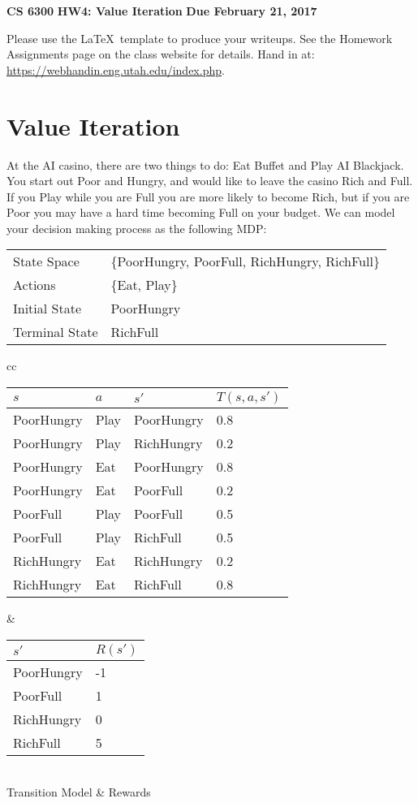\documentclass[12pt]{article}
\begin{document}
\begin{center}
{\bf CS 6300} \hfill {\large\bf HW4: Value Iteration} \hfill {\bf Due February 21, 2017}
\end{center}

\noindent
Please use the \LaTeX\ template to produce your writeups. See the
Homework Assignments page on the class website for details.  Hand in
at: \url{https://webhandin.eng.utah.edu/index.php}.

\section{Value Iteration}

At the AI casino, there are two things to do: Eat Buffet and Play AI
Blackjack.  You start out Poor and Hungry, and would like to leave the
casino Rich and Full.  If you Play while you are Full you are more
likely to become Rich, but if you are Poor you may have a hard time
becoming Full on your budget.  We can model your decision making
process as the following MDP:

\begin{flushleft}
\begin{tabular}{ll}
State Space & \{PoorHungry, PoorFull, RichHungry, RichFull\} \\
Actions     & \{Eat, Play\} \\
Initial State &  PoorHungry \\
Terminal State & RichFull 
\end{tabular}
\end{flushleft}

\begin{center}
\begin{tabular}{cc}
\begin{tabular}{|l|l|l|l|} \hline
$s$        & $a$  & $s'$       & $T(s,a,s')$ \\ \hline
PoorHungry & Play & PoorHungry & 0.8 \\ \hline
PoorHungry & Play & RichHungry & 0.2 \\ \hline
PoorHungry & Eat  & PoorHungry & 0.8 \\ \hline
PoorHungry & Eat  & PoorFull   & 0.2 \\ \hline
PoorFull   & Play & PoorFull   & 0.5 \\ \hline
PoorFull   & Play & RichFull   & 0.5 \\ \hline
RichHungry & Eat  & RichHungry & 0.2 \\ \hline
RichHungry & Eat  &RichFull    & 0.8 \\ \hline
\end{tabular} &
\begin{tabular}{|l|l|}\hline
$s'$       & $R(s')$ \\ \hline
PoorHungry & -1 \\  \hline
PoorFull   &  1 \\ \hline
RichHungry &  0 \\ \hline
RichFull   &  5 \\ \hline
\end{tabular} \\
Transition Model & Rewards
\end{tabular}
\end{center}
\end{document}

